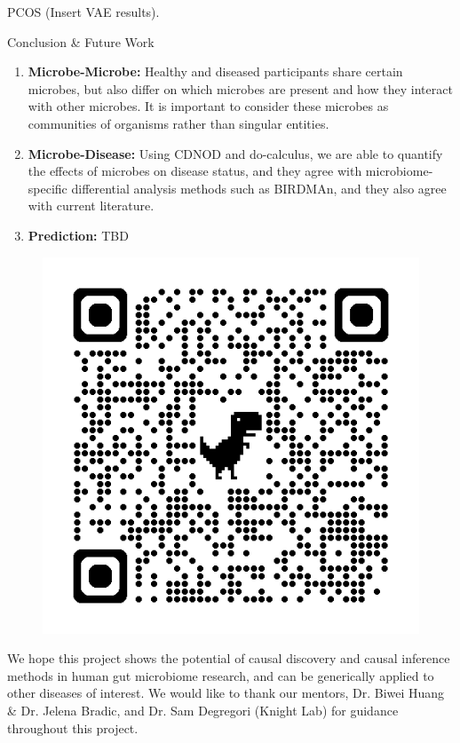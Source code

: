 \documentclass[final]{beamer}
\newlength{\colwidth}
\begin{document}
\begin{frame}[t]
\begin{columns}[t]
\begin{column}{\colwidth}
\begin{block}{PCOS}
   (Insert VAE results).

  \end{block}

  \begin{block}{Conclusion \& Future Work}
  
  \begin{enumerate}
      \item \textbf{Microbe-Microbe:} Healthy and diseased participants share certain microbes, but also differ on which microbes are present and how they interact with other microbes. It is important to consider these microbes as communities of organisms rather than singular entities.      
      \item \textbf{Microbe-Disease:} Using CDNOD and do-calculus, we are able to quantify the effects of microbes on disease status, and they agree with microbiome-specific differential analysis methods such as BIRDMAn, and they also agree with current literature.
      \item \textbf{Prediction:} TBD
   \end{enumerate}
	
	\begin{figure}
           \centering
           \includegraphics[width=\linewidth]{website_qr.png}
    	\end{figure} We hope this project shows the potential of causal discovery and causal inference methods in human gut microbiome research, and can be generically applied to other diseases of interest. We would like to thank our mentors, Dr. Biwei Huang \& Dr. Jelena Bradic,  and Dr. Sam Degregori (Knight Lab) for guidance throughout this project.
    

\end{block}
\end{column}
\end{columns}
\end{frame}
\end{document}
